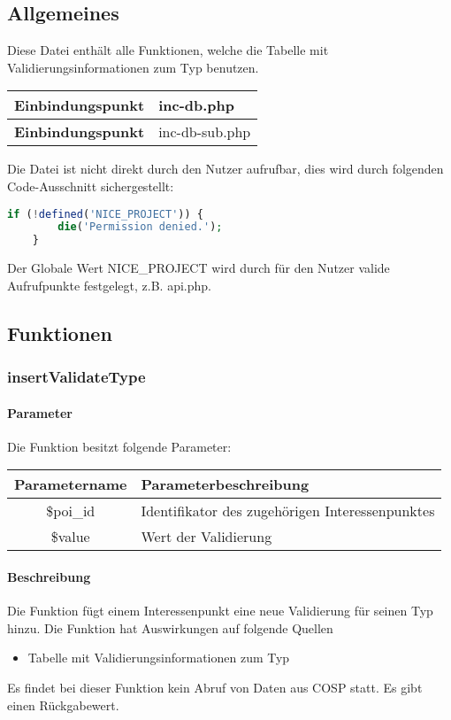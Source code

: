\subsection{Allgemeines} Diese Datei enthält alle Funktionen, welche die Tabelle mit Validierungsinformationen zum Typ benutzen.
\begin{table}[H]
	\begin{tabular}{|c|p{11cm}|}
		\hline
		\textbf{Einbindungspunkt} & inc-db.php \\ \hline
		\textbf{Einbindungspunkt} & inc-db-sub.php \\ \hline
	\end{tabular}
\end{table}
Die Datei ist nicht direkt durch den Nutzer aufrufbar, dies wird durch folgenden Code-Ausschnitt sichergestellt:
\begin{lstlisting}[language=php]
	if (!defined('NICE_PROJECT')) {
		die('Permission denied.');
	}
\end{lstlisting}
Der Globale Wert {\glqq NICE\_PROJECT\grqq} wird durch für den Nutzer valide Aufrufpunkte festgelegt, z.B. {\glqq api.php\grqq}.
\newpage
\subsection{Funktionen}
\subsubsection{insertValidateType}
\paragraph{Parameter} Die Funktion besitzt folgende Parameter:
\begin{table}[H]
	\begin{tabular}{|c|p{11cm}|}
		\hline
		\textbf{Parametername} & \textbf{Parameterbeschreibung} \\ \hline
		\$poi\_id & Identifikator des zugehörigen Interessenpunktes \\ \hline
		\$value   & Wert der Validierung \\ \hline
	\end{tabular}
\end{table}
\paragraph{Beschreibung} Die Funktion fügt einem Interessenpunkt eine neue Validierung für seinen Typ hinzu. Die Funktion hat Auswirkungen auf folgende Quellen
\begin{itemize}
	\item Tabelle mit Validierungsinformationen zum Typ
\end{itemize}
Es findet bei dieser Funktion kein Abruf von Daten aus {\glqq COSP\grqq} statt. Es gibt einen Rückgabewert.
